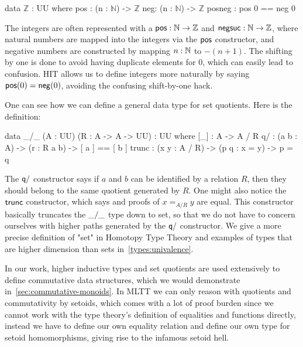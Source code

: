 \vspace{-1em}
\begin{code}
data $\mathbb{Z}$ : UU where
    pos : (n : $\mathbb{N}$) -> $\mathbb{Z}$
    neg: (n : $\mathbb{N}$) -> $\mathbb{Z}$
    posneg : pos 0 == neg 0
\end{code}
\vspace{1em}

The integers are often represented with a $\operatorname{\mathsf{pos}} : \mathbb{N} \to \mathbb{Z}$
and $\operatorname{\mathsf{negsuc}} : \mathbb{N} \to \mathbb{Z}$, where natural numbers
are mapped into the integers via the $\operatorname{\mathsf{pos}}$ constructor, and negative numbers are constructed
by mapping $n : \mathbb{N}$ to $-(n + 1)$. The shifting by one is done to avoid having duplicate elements
for 0, which can easily lead to confusion. HIT allows us to define integers more naturally by saying
$\operatorname{\mathsf{pos}}(0) = \operatorname{\mathsf{neg}}(0)$, avoiding the confusing shift-by-one hack.

One can see how we can define a general data type for set quotients. Here is the definition:
\vspace{-1em}
\begin{code}
data _/_ (A : UU) (R : A -> A -> UU) : UU where
    [_]  : A -> A / R
    q/ : (a b : A) -> (r : R a b) -> [ a ] == [ b ]
    trunc : (x y : A / R) -> (p q : x = y) -> p = q
\end{code}
\vspace{1em}

The $\operatorname{\mathsf{q/}}$ constructor says if $a$ and $b$ can be identified by a relation $R$, then
they should belong to the same quotient generated by $R$.
One might also notice the $\operatorname{\mathsf{trunc}}$ constructor, which says and proofs of $x =_{A/R} y$ are equal.
This constructor basically truncates the $\operatorname{\mathsf{\_/\_}}$ type down to set, so that we do not have to
concern ourselves with higher paths generated by the $\operatorname{\mathsf{q/}}$ constructor.
We give a more precise definition of "set" in Homotopy Type Theory and examples of types that are
higher dimension than sets in~\ref{types:univalence}.

In our work, higher inductive types and set quotients are used extensively to define commutative
data structures, which we would demonstrate in~\ref{sec:commutative-monoids}. In MLTT we can only
reason with quotients and commutativity by setoids, which comes with a lot of proof burden
since we cannot work with the type theory's definition of equalities and functions directly,
instead we have to define our own equality relation and define our own type for setoid homomorphisms,
giving rise to the infamous setoid hell.

